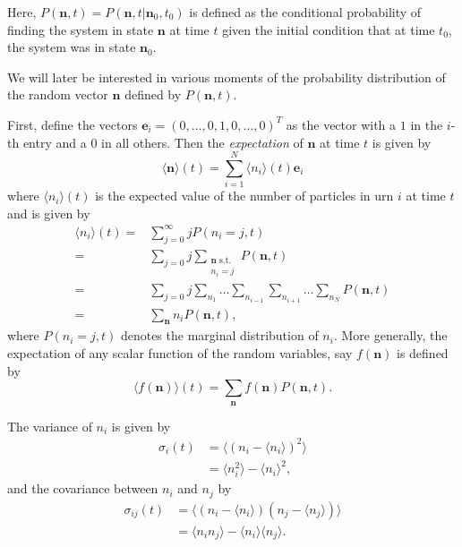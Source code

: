 \documentclass[a4paper,11pt]{article}
\numberwithin{equation}{section}
\newcommand{\V}[1]{\mathbf{#1}}
\newcommand{\E}[1]{\langle #1 \rangle}
\begin{document}
Here, \(P(\V{n},t) = P(\V{n},t | \V{n}_0, t_0)\) is defined as the conditional probability of finding the
system in state \(\V{n}\) at time \(t\) given the initial condition that at time
\(t_0\), the system was in state \(\V{n}_0\).

We will later be interested in various moments of the probability distribution
of the random vector \(\V{n}\) defined by \(P(\V{n},t)\).

First, define the vectors \(\V{e}_i = (0,\dotsc,0,1,0,\dotsc,0)^T\) as the
vector with a \(1\) in the \(i\)-th entry and a \(0\) in all others. Then the
\emph{expectation} of \(\V{n}\) at time \(t\) is given by
\begin{equation}
    \E{\V{n}}(t) = \sum_{i=1}^N \E{n_i}(t) \V{e}_i
    \label{eqn:expectation_n}
\end{equation}
where \(\E{n_i}(t)\) is the expected value of the number of particles in urn
\(i\) at time \(t\) and is given by
\begin{equation}
    \begin{aligned}
        \E{n_i}(t) =& \sum_{j=0}^\infty j P(n_i = j,t)\\
        =& \sum_{j=0} j
        \sum_{\substack{\V{n} \text{ s.t.} \\ n_i=j}} P(\V{n},t)\\
        =& \sum_{j=0} j
        \sum_{n_1} \dotso \sum_{n_{i-1}} \sum_{n_{i+1}} \dotso \sum_{n_N} P(\V{n},t)\\
        =& \sum_{\V{n}} n_i P(\V{n},t),
    \end{aligned}
    \label{eqn:expecation_n_i}
\end{equation}
where \(P(n_i = j,t)\) denotes the marginal distribution of \(n_i\).  More
generally, the expectation of any scalar function of the random variables, say
\(f(\V{n})\) is defined by
\begin{equation}
    \E{f(\V{n})}(t) = \sum_{\V{n}} f(\V{n}) P(\V{n},t).
    \label{eqn:expectation_f(n)}
\end{equation}

The variance of \(n_i\) is given by
\begin{equation}
    \begin{aligned}
        \sigma_i(t) &= \E{(n_i - \E{n_i})^2}\\
        &= \E{n_i^2} - \E{n_i}^2,
    \end{aligned}
    \label{eqn:variance_n_i}
\end{equation}
and the covariance between \(n_i\) and \(n_j\) by
\begin{equation}
    \begin{aligned}
        \sigma_{ij}(t) &= \E{(n_i - \E{n_i})(n_j - \E{n_j})}\\
        &= \E{n_i n_j} - \E{n_i} \E{n_j}.
    \end{aligned}
    \label{eqn:covariance_n_i_n_j}
\end{equation}
\end{document}
